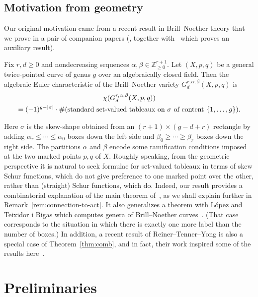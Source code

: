 \documentclass[ALCO,ThmDefs,Unicode,epreuves]{cedram}
\newcommand{\ZZ}{\mathbb{Z}}
\newcommand{\Grdab}{G^{r,\alpha,\beta}_d}
\begin{document}

\subsection*{Motivation from geometry} 
Our original motivation came from a recent result in Brill--Noether theory that we prove in a pair of companion papers (\cite{chan-pflueger-euler}, together with~\cite{chan-pflueger-relative} which proves an auxiliary result). 
\begin{theo} Fix $r,d\ge 0$ and nondecreasing sequences $\alpha,\beta\in\ZZ^{r+1}_{\ge 0}$. Let $(X,p,q)$ be a general twice-pointed curve of genus $g$ over an algebraically closed field.
Then the algebraic Euler characteristic of the Brill--Noether variety $\Grdab(X,p,q)$ is 
\begin{multline*}
\chi(\Grdab(X,p,q))\\ = (-1)^{g-|\sigma|} \cdot \#(\text{standard set-valued tableaux on $\sigma$ of %
content }\{1,\ldots,g\}).
\end{multline*}
\end{theo}	 
\noindent Here $\sigma$ is the skew-shape obtained from an $(r+1)\times (g-d+r)$ rectangle by adding $\alpha_r \le \cdots \le \alpha_0$ boxes down the left side and $\beta_0\ge \cdots \ge \beta_r$ boxes down the right side. The partitions $\alpha$ and $\beta$ encode some ramification conditions imposed at the two marked points $p,q$ of $X$. Roughly speaking, from the geometric perspective it is natural to seek formulae for set-valued tableaux in terms of skew Schur functions, which do not give preference to one marked point over the other, rather than (straight) Schur functions, which do.
Indeed, 
our result provides a combinatorial explanation of the main theorem of~\cite{anderson-chen-tarasca-k-classes}, as we shall explain further in Remark~\ref{rem:connection-to-act}. It also generalizes a theorem with L\'opez and Teixidor i Bigas which computes genera of Brill--Noether curves~\cite{clpt}. (That case corresponds to the situation in which there is exactly one more label than the number of boxes.) 
In addition, a recent result of Reiner--Tenner--Yong 
is also a special case of Theorem~\ref{thm:comb}, and in fact, their work inspired some of the results here~\cite[Corollary~3.11]{reiner-tenner-yong}. 

\section{Preliminaries}\label{sec:prelim}
\end{document}
